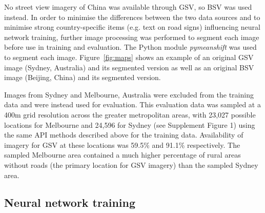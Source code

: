 \documentclass[Crown,sageh,times]{sagej}
\begin{document}
No street view imagery of China was available through GSV, so BSV was used instead.  In order to minimise the differences between the two data sources and to minimise strong country-specific items (e.g. text on road signs) influencing neural network training, further image processing was performed to segment each image before use in training and evaluation. The Python module \textit{pymeanshift} \citep{Pymeanshift2017} was used to segment each image. Figure~\ref{fig:maps} shows an example of an original GSV image (Sydney, Australia) and its segmented version as well as an original BSV image (Beijing, China) and its segmented version.






Images from Sydney and Melbourne, Australia were excluded from the training data and were instead used for evaluation. This evaluation data was sampled at a 400m grid resolution across the greater metropolitan areas, with 23,027 possible locations for Melbourne and 24,596 for Sydney (see Supplement Figure 1) using the same API methods described above for the training data. Availability of imagery for GSV at these locations was 59.5\% and 91.1\% respectively. The sampled Melbourne area contained a much higher percentage of rural areas without roads (the primary location for GSV imagery) than the sampled Sydney area.





\subsection{Neural network training}\label{sec:methods4}    
\end{document}
